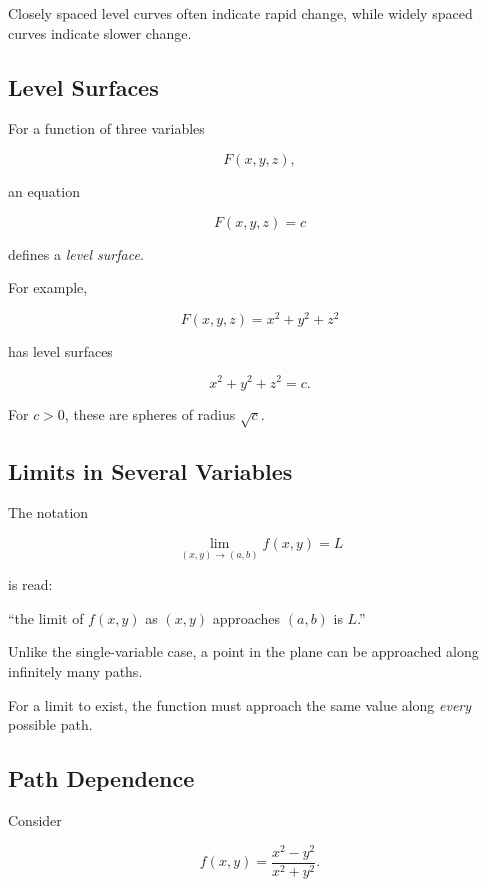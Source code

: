 Closely spaced level curves often indicate rapid change, while widely spaced
curves indicate slower change.

\subsection{Level Surfaces}
\label{subsec:level-surfaces}

For a function of three variables

\[ F(x,y,z), \]

an equation

\[ F(x,y,z)=c \]

defines a \emph{level surface}.

For example,

\[ F(x,y,z)=x^2+y^2+z^2 \]

has level surfaces

\[ x^2+y^2+z^2=c. \]

For \(c>0\), these are spheres of radius \(\sqrt c\).

\subsection{Limits in Several Variables}
\label{subsec:multivariable-limits}

The notation

\[ \lim_{(x,y)\to(a,b)}f(x,y)=L \]

is read:

``the limit of \(f(x,y)\) as \((x,y)\) approaches \((a,b)\) is \(L\).''

Unlike the single-variable case, a point in the plane can be approached
along infinitely many paths.

For a limit to exist, the function must approach the same value along
\emph{every} possible path.

\subsection{Path Dependence}
\label{subsec:path-dependence}

Consider

\[ f(x,y)=\frac{x^2-y^2}{x^2+y^2}. \]

